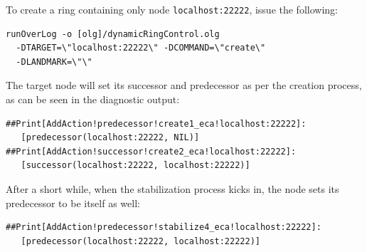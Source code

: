 \documentclass{article}
\begin{document}
To create a ring containing only node 
\lstinline$localhost:22222$, issue the following:
\begin{verbatim}
runOverLog -o [olg]/dynamicRingControl.olg
  -DTARGET=\"localhost:22222\" -DCOMMAND=\"create\"
  -DLANDMARK=\"\"
\end{verbatim}
The target node will set its successor and predecessor as per the
creation process, as can be seen in the diagnostic output:
\begin{verbatim}
##Print[AddAction!predecessor!create1_eca!localhost:22222]:
   [predecessor(localhost:22222, NIL)]
##Print[AddAction!successor!create2_eca!localhost:22222]:
   [successor(localhost:22222, localhost:22222)]
\end{verbatim}
After a short while, when the stabilization process kicks in, the node
sets its predecessor to be itself as well:
\begin{verbatim}
##Print[AddAction!predecessor!stabilize4_eca!localhost:22222]:
   [predecessor(localhost:22222, localhost:22222)]
\end{verbatim}
\end{document}
